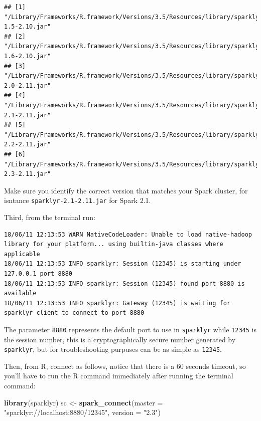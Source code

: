 \documentclass[]{book}
\newenvironment{Shaded}{\begin{snugshade}}{\end{snugshade}}
\newcommand{\DataTypeTok}[1]{\textcolor[rgb]{0.13,0.29,0.53}{#1}}
\newcommand{\ExtensionTok}[1]{#1}
\newcommand{\KeywordTok}[1]{\textcolor[rgb]{0.13,0.29,0.53}{\textbf{#1}}}
\newcommand{\NormalTok}[1]{#1}
\newcommand{\StringTok}[1]{\textcolor[rgb]{0.31,0.60,0.02}{#1}}
\newcommand{\VariableTok}[1]{\textcolor[rgb]{0.00,0.00,0.00}{#1}}
\theoremstyle{definition}
\theoremstyle{definition}
\theoremstyle{definition}
\theoremstyle{remark}
\begin{document}
\begin{verbatim}
## [1] "/Library/Frameworks/R.framework/Versions/3.5/Resources/library/sparklyr/java/sparklyr-1.5-2.10.jar"
## [2] "/Library/Frameworks/R.framework/Versions/3.5/Resources/library/sparklyr/java/sparklyr-1.6-2.10.jar"
## [3] "/Library/Frameworks/R.framework/Versions/3.5/Resources/library/sparklyr/java/sparklyr-2.0-2.11.jar"
## [4] "/Library/Frameworks/R.framework/Versions/3.5/Resources/library/sparklyr/java/sparklyr-2.1-2.11.jar"
## [5] "/Library/Frameworks/R.framework/Versions/3.5/Resources/library/sparklyr/java/sparklyr-2.2-2.11.jar"
## [6] "/Library/Frameworks/R.framework/Versions/3.5/Resources/library/sparklyr/java/sparklyr-2.3-2.11.jar"
\end{verbatim}

Make sure you identify the correct version that matches your Spark
cluster, for isntance \texttt{sparklyr-2.1-2.11.jar} for Spark 2.1.

Third, from the terminal run:

\begin{Shaded}
\end{Shaded}

\begin{verbatim}
18/06/11 12:13:53 WARN NativeCodeLoader: Unable to load native-hadoop library for your platform... using builtin-java classes where applicable
18/06/11 12:13:53 INFO sparklyr: Session (12345) is starting under 127.0.0.1 port 8880
18/06/11 12:13:53 INFO sparklyr: Session (12345) found port 8880 is available
18/06/11 12:13:53 INFO sparklyr: Gateway (12345) is waiting for sparklyr client to connect to port 8880
\end{verbatim}

The parameter \texttt{8880} represents the default port to use in
\texttt{sparklyr} while \texttt{12345} is the session number, this is a
cryptographically secure number generated by \texttt{sparklyr}, but for
troubleshooting purpuses can be as simple as \texttt{12345}.

Then, from R, connect as follows, notice that there is a 60 seconds
timeout, so you'll have to run the R command immediately after running
the terminal command:

\begin{Shaded}
\begin{Highlighting}[]
\KeywordTok{library}\NormalTok{(sparklyr)}
\NormalTok{sc <-}\StringTok{ }\KeywordTok{spark_connect}\NormalTok{(}\DataTypeTok{master =} \StringTok{"sparklyr://localhost:8880/12345"}\NormalTok{, }\DataTypeTok{version =} \StringTok{"2.3"}\NormalTok{)}
\end{Highlighting}
\end{Shaded}
\end{document}
